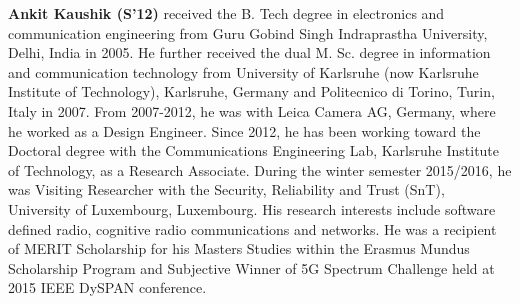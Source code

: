 \documentclass[journal, twocolumn]{IEEEtran}
\begin{document}
\begin{IEEEbiography}
{\textbf{Ankit Kaushik (S'12)}} received the B. Tech degree in electronics and communication engineering from Guru Gobind Singh Indraprastha University, Delhi, India in 2005. He further received the dual M. Sc. degree in information and communication technology from University of Karlsruhe (now Karlsruhe Institute of Technology), Karlsruhe, Germany and Politecnico di Torino, Turin, Italy in 2007. From 2007-2012, he was with Leica Camera AG, Germany, where he worked as a Design Engineer. Since 2012, he has been working toward the Doctoral degree with the Communications Engineering Lab, Karlsruhe Institute of Technology, as a Research Associate. During the winter semester 2015/2016, he was Visiting Researcher with the Security, Reliability and Trust (SnT), University of Luxembourg, Luxembourg. His research interests include software defined radio, cognitive radio communications and networks. He was a recipient of MERIT Scholarship for his Masters Studies within the Erasmus Mundus Scholarship Program and Subjective Winner of 5G Spectrum Challenge held at 2015 IEEE DySPAN conference.
\end{IEEEbiography}
\end{document}
